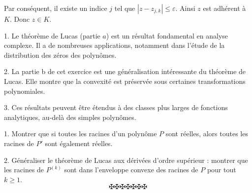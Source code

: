 Par cons{\'e}quent, il existe un indice $j$ tel que $|z - z_{j, k} | \leq
\varepsilon$. Ainsi $z$ est adh{\'e}rent {\`a} $K$. Donc $z \in K$.


1. Le th{\'e}or{\`e}me de Lucas (partie $a$) est un r{\'e}sultat fondamental
en analyse complexe. Il a de nombreuses applications, notamment dans
l'{\'e}tude de la distribution des z{\'e}ros des polyn{\^o}mes.

2. La partie b de cet exercice est une g{\'e}n{\'e}ralisation int{\'e}ressante
du th{\'e}or{\`e}me de Lucas. Elle montre que la convexit{\'e} est
pr{\'e}serv{\'e}e sous certaines transformations polynomiales.

3. Ces r{\'e}sultats peuvent {\^e}tre {\'e}tendus {\`a} des classes plus
larges de fonctions analytiques, au-del{\`a} des simples polyn{\^o}mes.


1. Montrer que si toutes les racines d'un polyn{\^o}me $P$ sont r{\'e}elles,
alors toutes les racines de $P'$ sont {\'e}galement r{\'e}elles.

2. G{\'e}n{\'e}raliser le th{\'e}or{\`e}me de Lucas aux d{\'e}riv{\'e}es
d'ordre sup{\'e}rieur : montrer que les racines de $P^{(k)}$ sont dans
l'enveloppe convexe des racines de $P$ pour tout $k \geq 1$.
\[ \maltese \maltese \maltese \maltese \maltese \maltese \maltese \]
